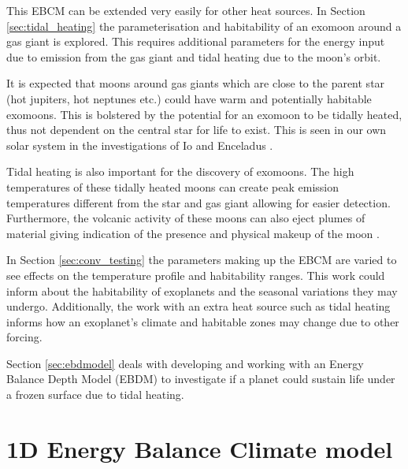 \documentclass[12pt, onecolumn]{revtex4-2}    %
\begin{document}

This EBCM can be extended very easily for other heat sources.
In Section \ref{sec:tidal_heating} the parameterisation and habitability of an exomoon around a gas giant is explored.
This requires additional parameters for the energy input due to emission from the gas giant and tidal heating due to the moon's orbit.

It is expected that moons around gas giants which are close to the parent star (hot jupiters, hot neptunes etc.) could have warm and potentially habitable exomoons.
This is bolstered by the potential for an exomoon to be tidally heated, thus not dependent on the central star for life to exist.
This is seen in our own solar system in the investigations of Io and Enceladus \cite{SAB22}.

Tidal heating is also important for the discovery of exomoons.
The high temperatures of these tidally heated moons can create peak emission temperatures different from the star and gas giant allowing for easier detection.
Furthermore, the volcanic activity of these moons can also eject plumes of material giving indication of the presence and physical makeup of the moon \cite{RN21}.


In Section \ref{sec:conv_testing} the parameters making up the EBCM are varied to see effects on the temperature profile and habitability ranges.
This work could inform about the habitability of exoplanets and the seasonal variations they may undergo.
Additionally, the work with an extra heat source such as tidal heating informs how an exoplanet's climate and habitable zones may change due to other forcing.

Section \ref{sec:ebdmodel} deals with developing and working with an Energy Balance Depth Model (EBDM) to investigate if a planet could sustain life under a frozen surface due to tidal heating.


\section{1D Energy Balance Climate model} \label{sec:ebcmodel}
\end{document}
